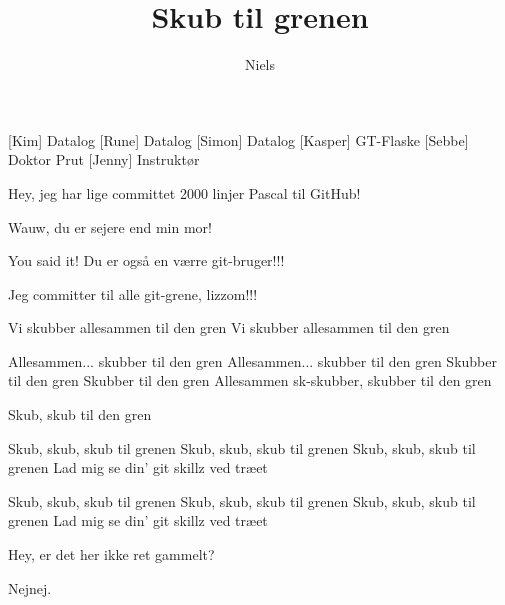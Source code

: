 \documentclass[a4paper,11pt]{article}
\title{Skub til grenen}
\author{Niels}
\begin{document}
\maketitle

\begin{roles}
[Kim] Datalog
[Rune] Datalog
[Simon] Datalog
[Kasper] GT-Flaske
[Sebbe] Doktor Prut
[Jenny] Instruktør
\end{roles}

\begin{sketch}


 Hey, jeg har lige committet 2000 linjer Pascal til GitHub!

 Wauw, du er sejere end min mor!

 You said it!  Du er også en værre git-bruger!!!

 Jeg committer til alle git-grene, lizzom!!!


\end{sketch}

\begin{song}

%
Vi skubber allesammen til den gren
Vi skubber allesammen til den gren

Allesammen... skubber til den gren
Allesammen... skubber til den gren
Skubber til den gren
Skubber til den gren
Allesammen sk-skubber, skubber til den gren

Skub, skub til den gren

Skub, skub, skub til grenen
Skub, skub, skub til grenen
Skub, skub, skub til grenen
Lad mig se din' git skillz ved træet

Skub, skub, skub til grenen
Skub, skub, skub til grenen
Skub, skub, skub til grenen
Lad mig se din' git skillz ved træet


 Hey, er det her ikke ret gammelt?

 Nejnej.


\end{song}
\end{document}
